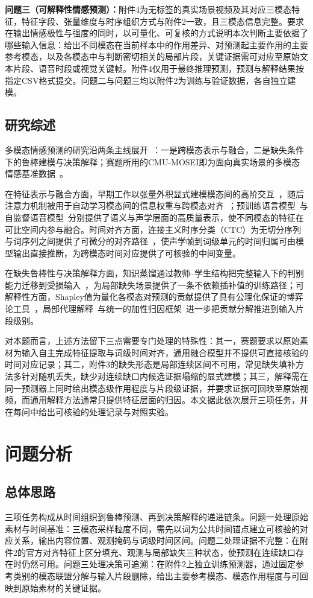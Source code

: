 \textbf{问题三（可解释性情感预测）：}附件4为无标签的真实场景视频及其对应三模态特征，特征字段、张量维度与时序组织方式与附件2一致，且三模态信息完整。要求在输出情感极性与强度的同时，以可量化、可复核的方式说明本次判断主要依据了哪些输入信息：给出不同模态在当前样本中的作用差异、对预测起主要作用的主要参考模态，以及各模态中与判断密切相关的局部片段，关键证据需可对应至原始文本片段、语音时段或视觉关键帧。附件4仅用于最终推理预测，预测与解释结果按指定CSV格式提交。问题二与问题三均以附件2为训练与验证数据，各自独立建模。

\subsection{研究综述}
多模态情感预测的研究沿两条主线展开~\cite{ref:mm}：一是跨模态表示与融合，二是缺失条件下的鲁棒建模与决策解释；赛题所用的CMU-MOSEI即为面向真实场景的多模态情感基准数据~\cite{ref:mosei}。

在特征表示与融合方面，早期工作以张量外积显式建模模态间的高阶交互~\cite{ref:tfn}，随后注意力机制被用于自动学习模态间的信息权重与跨模态对齐~\cite{ref:mtfn}；预训练语言模型~\cite{ref:bert}与自监督语音模型~\cite{ref:wav2vec2}分别提供了语义与声学层面的高质量表示，使不同模态的特征在可比空间内参与融合。时间对齐方面，连接主义时序分类（CTC）为无切分序列与词序列之间提供了可微分的对齐路径~\cite{ref:ctc}，使声学帧到词级单元的时间归属可由模型输出直接推断，为跨模态时间对应提供了可核验的中间变量。

在缺失鲁棒性与决策解释方面，知识蒸馏通过教师--学生结构把完整输入下的判别能力迁移到受损输入~\cite{ref:kd}，为局部缺失场景提供了一条不依赖插补值的训练路径；可解释性方面，Shapley值为量化各模态对预测的贡献提供了具有公理化保证的博弈论工具~\cite{ref:shapley}，局部代理解释~\cite{ref:lime}与统一的加性归因框架~\cite{ref:shap}进一步把贡献分解推进到输入片段级别。

对本题而言，上述方法留下三点需要专门处理的特殊性：其一，赛题要求以原始素材为输入自主完成特征提取与词级时间对齐，通用融合模型并不提供可直接核验的时间对应记录；其二，附件3的缺失形态是局部连续区间不可用，常见缺失填补方法多针对随机丢失，缺少对连续缺口内候选证据塌缩的显式建模；其三，解释需在同一预测器上同时给出模态级作用程度与片段级证据，并要求证据可回映至原始视频，而通用解释方法通常只提供特征层面的归因。本文据此依次展开三项任务，并在每问中给出可核验的处理记录与对照实验。

\section{问题分析}
\subsection{总体思路}
三项任务构成从时间组织到鲁棒预测、再到决策解释的递进链条。问题一处理原始素材与时间基准：三模态采样粒度不同，需先以词为公共时间锚点建立可核验的对应关系，输出内容位置、观测掩码与词级时间区间。问题二处理证据不完整：在附件2的官方对齐特征上区分填充、观测与局部缺失三种状态，使预测在连续缺口存在时仍然可用。问题三处理决策可追溯：在附件2上独立训练预测器，通过固定参考类别的模态联盟分解与输入片段删除，给出主要参考模态、模态作用程度与可回映到原始素材的关键证据。

